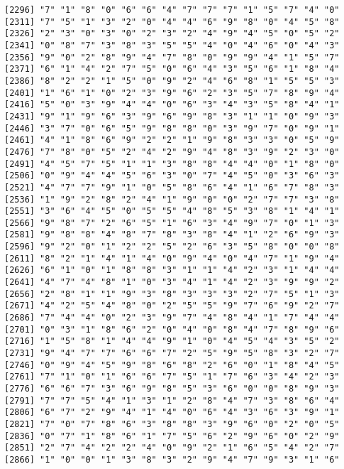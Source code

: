 \documentclass{article}
\begin{document}
\begin{itemize}
\begin{scriptsize}
\begin{verbatim}
[2296] "7" "1" "8" "0" "6" "6" "4" "7" "7" "7" "1" "5" "7" "4" "0"
[2311] "7" "5" "1" "3" "2" "0" "4" "4" "6" "9" "8" "0" "4" "5" "8"
[2326] "2" "3" "0" "3" "0" "2" "3" "2" "4" "9" "4" "5" "0" "5" "2"
[2341] "0" "8" "7" "3" "8" "3" "5" "5" "4" "0" "4" "6" "0" "4" "3"
[2356] "9" "0" "2" "8" "9" "4" "7" "8" "0" "9" "9" "4" "1" "5" "7"
[2371] "6" "1" "4" "2" "7" "5" "0" "6" "4" "3" "5" "6" "1" "8" "4"
[2386] "8" "2" "2" "1" "5" "0" "9" "2" "4" "6" "8" "1" "5" "5" "3"
[2401] "1" "6" "1" "0" "2" "3" "9" "6" "2" "3" "5" "7" "8" "9" "4"
[2416] "5" "0" "3" "9" "4" "4" "0" "6" "3" "4" "3" "5" "8" "4" "1"
[2431] "9" "1" "9" "6" "3" "9" "6" "9" "8" "3" "1" "1" "0" "9" "3"
[2446] "3" "7" "0" "6" "5" "9" "8" "8" "0" "3" "9" "7" "0" "9" "1"
[2461] "4" "1" "8" "6" "9" "2" "2" "1" "9" "8" "3" "3" "0" "5" "9"
[2476] "7" "8" "0" "5" "2" "4" "2" "9" "4" "8" "3" "9" "2" "3" "0"
[2491] "4" "5" "7" "5" "1" "1" "3" "8" "8" "4" "4" "0" "1" "8" "0"
[2506] "0" "9" "4" "4" "5" "6" "3" "0" "7" "4" "5" "0" "3" "6" "3"
[2521] "4" "7" "7" "9" "1" "0" "5" "8" "6" "4" "1" "6" "7" "8" "3"
[2536] "1" "9" "2" "8" "2" "4" "1" "9" "0" "0" "2" "7" "7" "3" "8"
[2551] "3" "6" "4" "5" "0" "5" "5" "4" "8" "5" "3" "8" "1" "4" "1"
[2566] "9" "8" "7" "2" "6" "5" "1" "6" "3" "4" "9" "7" "0" "1" "3"
[2581] "9" "8" "8" "4" "8" "7" "8" "3" "8" "4" "1" "2" "6" "9" "3"
[2596] "9" "2" "0" "1" "2" "2" "5" "2" "6" "3" "5" "8" "0" "0" "8"
[2611] "8" "2" "1" "4" "1" "4" "0" "9" "4" "0" "4" "7" "1" "9" "4"
[2626] "6" "1" "0" "1" "8" "8" "3" "1" "1" "4" "2" "3" "1" "4" "4"
[2641] "4" "7" "4" "8" "1" "0" "3" "4" "1" "4" "2" "3" "9" "9" "2"
[2656] "2" "8" "1" "1" "9" "3" "8" "3" "3" "3" "2" "7" "5" "1" "3"
[2671] "4" "2" "5" "4" "8" "0" "2" "5" "5" "9" "7" "6" "9" "2" "7"
[2686] "7" "4" "4" "0" "2" "3" "9" "7" "4" "8" "4" "1" "7" "4" "4"
[2701] "0" "3" "1" "8" "6" "2" "0" "4" "0" "8" "4" "7" "8" "9" "6"
[2716] "1" "5" "8" "1" "4" "4" "9" "1" "0" "4" "5" "4" "3" "5" "2"
[2731] "9" "4" "7" "7" "6" "6" "7" "2" "5" "9" "5" "8" "3" "2" "7"
[2746] "0" "9" "4" "5" "9" "8" "6" "8" "2" "6" "0" "1" "8" "4" "5"
[2761] "7" "1" "0" "1" "6" "6" "7" "5" "1" "7" "6" "3" "4" "2" "3"
[2776] "6" "6" "7" "3" "6" "9" "8" "5" "3" "6" "0" "0" "8" "9" "3"
[2791] "7" "7" "5" "4" "1" "3" "1" "2" "8" "4" "7" "3" "8" "6" "4"
[2806] "6" "7" "2" "9" "4" "1" "4" "0" "6" "4" "3" "6" "3" "9" "1"
[2821] "7" "0" "7" "8" "6" "3" "8" "8" "3" "9" "6" "0" "2" "0" "5"
[2836] "0" "7" "1" "8" "6" "1" "7" "5" "6" "2" "9" "6" "0" "2" "9"
[2851] "2" "7" "4" "2" "2" "4" "0" "9" "2" "1" "6" "5" "4" "2" "7"
[2866] "1" "0" "0" "1" "3" "8" "3" "2" "9" "4" "7" "9" "3" "1" "6"

\end{verbatim}
\end{scriptsize}
\end{itemize}
\end{document}

